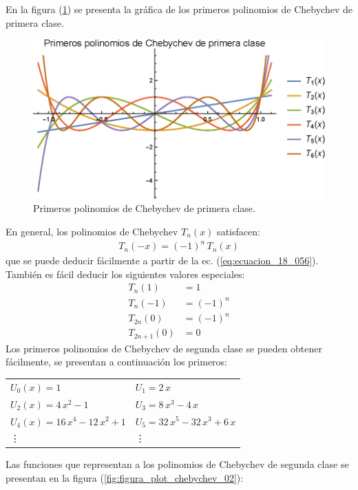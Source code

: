 En la figura (\ref{fig:figura_plot_chebychev_01}) se presenta la gráfica de los primeros polinomios de Chebychev de primera clase.
\begin{figure}[H]
    \centering
    \includegraphics[scale=1]{Imagenes/Plot_Polinomios_Chebychev_01.eps}
    \caption{Primeros polinomios de Chebychev de primera clase.}
    \label{fig:figura_plot_chebychev_01}
\end{figure}
En general, los polinomios de Chebychev $T_{n}(x)$ satisfacen:
\begin{align*}
T_{n}(-x) = (-1)^{n} \, T_{n} (x)
\end{align*}
que se puede deducir fácilmente a partir de la ec. (\ref{eq:ecuacion_18_056}). También es fácil deducir los siguientes valores especiales:
\begin{align*}
T_{n} (1) &= 1 \\[0.5em]
T_{n} (-1) &= (-1)^{n} \\[0.5em]
T_{2n} (0) &= (-1)^{n} \\[0.5em]
T_{2n+1} (0) &= 0
\end{align*}
Los primeros polinomios de Chebychev de segunda clase se pueden obtener fácilmente, se presentan a continuación los primeros:
\begin{table}[H]
\centering
\fontsize{14}{14}\selectfont
\begin{tabular}{p{6cm} p{6cm}}
$U_{0}(x) = 1$ & $U_{1} = 2 \, x$ \\[0.5em]
$U_{2}(x) = 4 \, x^{2} - 1$ & $U_{3} = 8 \, x^{3} - 4 \, x$ \\[0.5em]
$U_{4}(x) = 16 \, x^{4} - 12 \, x^{2} + 1$ & $U_{5} = 32 \, x^{5} - 32 \, x^{3} + 6 \, x$ \\[0.5em]
\vdots & \vdots
\end{tabular}
\end{table}
Las funciones que representan a los polinomios de Chebychev de segunda clase se presentan en la figura (\ref{fig:figura_plot_chebychev_02}):
